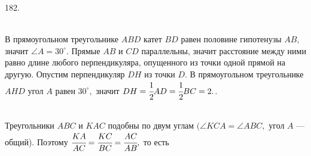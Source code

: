 \documentclass[12pt]{article}
\begin{document}
182. \begin{figure}[ht!]
\end{figure}\\
В прямоугольном треугольнике $ABD$ катет $BD$ равен половине гипотенузы $AB,$ значит $\angle A=30^\circ.$ Прямые $AB$ и $CD$ параллельны, значит расстояние между ними равно длине любого перпендикуляра, опущенного из точки одной прямой на другую. Опустим перпендикуляр $DH$ из точки $D.$ В прямоугольном треугольнике $AHD$ угол $A$ равен $30^\circ,$ значит $DH=\cfrac{1}{2}AD=\cfrac{1}{2}BC=2.$\newpage{}. \begin{figure}[ht!]
\end{figure}\\
Треугольники $ABC$ и $KAC$ подобны по двум углам $(\angle KCA = \angle ABC,$ угол $A$ --- общий). Поэтому $\cfrac{KA}{AC}=\cfrac{KC}{BC}=\cfrac{AC}{AB},$ то есть
\end{document}
